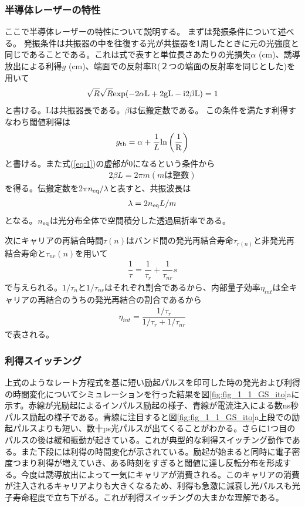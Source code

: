 \subsubsection{半導体レーザーの特性}
ここで半導体レーザーの特性について説明する。
まずは発振条件について述べる。
発振条件は共振器の中を往復する光が共振器を1周したときに元の光強度と同じであることである。これは式で表すと単位長さあたりの光損失$\alpha$ (cm)、誘導放出による利得$g$ (cm)、端面での反射率R(２つの端面の反射率を同じとした)を用いて
\begin{eqnarray}
\sqrt{R}\sqrt{R} \rm{exp}(-2\alpha L+ 2gL-i2\beta L)=1
\label{eq:1}
\end{eqnarray}
と書ける。Lは共振器長である。$\beta$は伝搬定数である。
この条件を満たす利得すなわち閾値利得は
\begin{equation}
g_{\rm{th}}=\alpha+\dfrac{1}{L}\rm{ln}\left(\dfrac{1}{R}\right)
\end{equation}
と書ける。また式(\ref{eq:1})の虚部が0になるという条件から
\begin{eqnarray}
2\beta L=2\pi m   (mは整数)
\end{eqnarray}
を得る。伝搬定数を2$\pi n_{\rm{eq}}/\lambda$と表すと、共振波長は
\begin{eqnarray}
\lambda =2n_{\rm{eq}}L/m
\end{eqnarray}
となる。$n_{\rm{eq}}$は光分布全体で空間積分した透過屈折率である。

次にキャリアの再結合時間$\tau(n)$はバンド間の発光再結合寿命$\tau_{r(n)}$と非発光再結合寿命と$\tau_{nr}(n)$を用いて
\begin{eqnarray}
\dfrac{1}{\tau}=\dfrac{1}{\tau_{r}}+\dfrac{1}{\tau_{nr}}
s
\label{eq:tau_r}
\end{eqnarray}
で与えられる。$1/\tau_{n}$と$1/\tau_{nr}$はそれぞれ割合であるから、内部量子効率$\eta_{int}$は全キャリアの再結合のうちの発光再結合の割合であるから
\begin{eqnarray}
\eta_{int}=\dfrac{1/\tau_{r}}{1/\tau_{r}+1/\tau_{nr}}
\end{eqnarray}
で表される。
\subsubsection{利得スイッチング}
上式のようなレート方程式を基に短い励起パルスを印可した時の発光および利得の時間変化についてシミュレーションを行った結果を図\ref{fig:fig_1_1_GS_ito}aに示す。赤線が光励起によるインパルス励起の様子、青線が電流注入による数ns秒パルス励起の様子である。青線に注目すると図\ref{fig:fig_1_1_GS_ito}a上段での励起パルスよりも短い、数十ps光パルスが出てくることがわかる。さらに1つ目のパルスの後は緩和振動が起きている。これが典型的な利得スイッチング動作である。また下段には利得の時間変化が示されている。励起が始まると同時に電子密度つまり利得が増えていき、ある時刻をすぎると閾値に達し反転分布を形成する。今度は誘導放出によって一気にキャリアが消費される。このキャリアの消費が注入されるキャリアよりも大きくなるため、利得も急激に減衰し光パルスも光子寿命程度で立ち下がる。これが利得スイッチングの大まかな理解である。

